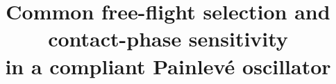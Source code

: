 \documentclass[11pt]{article}
\title{Common free-flight selection and contact-phase sensitivity\\
in a compliant Painlev\'e oscillator}
\author{\paperauthorblock}
\date{}
\begin{document}
\maketitle
\begingroup
\renewcommand{\thefootnote}{}%
\begin{NoHyper}%
%
\end{NoHyper}%
\endgroup











\appendix








\end{document}
